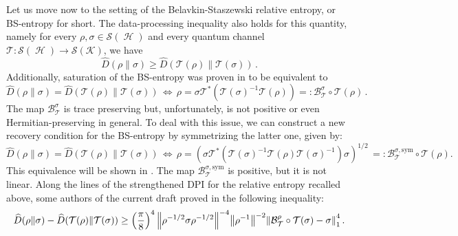 \documentclass[11pt]{article}
\theoremstyle{newdefinition}
\theoremstyle{newplain}
\theoremstyle{myplain}
\DeclareMathOperator{\HH}{\mathcal{H}}
\DeclareMathOperator{\1}{\mathds{1}}
\begin{document}


Let us move now to the setting of the Belavkin-Staszewski relative entropy, or BS-entropy for short. The data-processing inequality also holds for this quantity, namely for every $\rho, \sigma \in \mathcal{S}(\HH)$ and every quantum channel $\mathcal{T}: \mathcal{S}(\HH) \rightarrow \mathcal{S}(\mathcal{K})$, we have
\begin{equation}
    \widehat{D}(\rho \| \sigma) \geq \widehat{D} (\mathcal{T}(\rho) \| \mathcal{T}(\sigma)) \, .
\end{equation}
Additionally, saturation of the BS-entropy was proven in \cite{BluhmCapel-BSentropy-2019} to be equivalent to 
\begin{equation}
    \widehat{D}(\rho \| \sigma) = \widehat{D} (\mathcal{T}(\rho) \| \mathcal{T}(\sigma)) \, \Leftrightarrow \, \rho = \sigma \mathcal{T}^*(\mathcal{T}(\sigma)^{-1} \mathcal{T}(\rho)) =: \mathcal{B}^\sigma_{\mathcal{T}} \circ \mathcal{T} (\rho)  \, .
\end{equation}
The map $\mathcal{B}^\sigma_{\mathcal{T}}$ is trace preserving but, unfortunately, is not positive or even Hermitian-preserving in general. To deal with this issue,  
we can construct a new recovery condition for the BS-entropy by symmetrizing the latter one, given by:
\begin{equation}
    \widehat{D}(\rho \| \sigma) = \widehat{D} (\mathcal{T}(\rho) \| \mathcal{T}(\sigma)) \, \Leftrightarrow \, \rho =( \sigma \mathcal{T}^*(\mathcal{T}(\sigma)^{-1} \mathcal{T}(\rho)\mathcal{T}(\sigma)^{-1}) \sigma )^{1/2}\, =: \mathcal{B}^{\sigma,\text{sym}}_{\mathcal{T}}\circ \mathcal{T} (\rho) .
\end{equation}
This equivalence will be shown in . The map $\mathcal{B}^{\sigma,\text{sym}}_{\mathcal{T}}$ is positive, but it is not linear.  Along the lines of the strengthened DPI for the relative entropy recalled above, some authors of the current draft proved in \cite{BluhmCapel-BSentropy-2019} the following inequality:
\begin{equation}\label{eq:DPIBSentropy}
     \widehat{D}(\rho \| \sigma ) - \widehat{D}(\mathcal{T} (\rho) \| \mathcal{T}(\sigma) ) \geq \left( \frac{\pi}{8} \right)^4 \norm{\rho^{-1/2}\sigma \rho^{-1/2}}^{-4} \norm{\rho^{-1}}^{-2} \norm{ \mathcal{B}^\rho_{\mathcal{T}}\circ \mathcal{T}(\sigma) - \sigma }_1^4 \, .
\end{equation}
\end{document}
